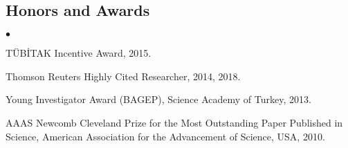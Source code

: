 \documentclass[margin,line]{res}
\newenvironment{list2}{
  \begin{list}{$\bullet$}{%
      \setlength{\itemsep}{0.1cm}
      \setlength{\parsep}{0in} \setlength{\parskip}{0in}
      \setlength{\topsep}{0in} \setlength{\partopsep}{0in} 
      \setlength{\leftmargin}{0.2in}}}{\end{list}}
\newenvironment{list4}{
  \begin{list}{$\bullet$}{%
      \setlength{\itemsep}{0cm}
      \setlength{\parsep}{0in} \setlength{\parskip}{0in}
      \setlength{\topsep}{0in} \setlength{\partopsep}{0in} 
      \setlength{\leftmargin}{0.2in}}}{\end{list}}
\newcommand{\junk}[1]{}
\begin{document}
\begin{resume}
          \junk{
            \section{\sc Academic Experience}
                    {\bf Case Western Reserve University}, Cleveland, Ohio, USA\\
                    
                    \vspace{-.2cm}
                           {\em Graduate Student \& Research Assistant} \hfill {\bf August, 2000
                             - August 2005}\\
                           Included  Ph.D.~research, Ph.D. level course work and
                           research projects, reviewing papers for bioinformatics, algorithms, and
                           database conferences and journals.
                           
                           {\em Teaching Assistant} \hfill {\bf August, 2000  - May 2001}\\
                           Duties included grading homework and office hours. 
                           \begin{list2}
                           \item Systems Programming, Fall 2000
                           \item Introduction to Bioinformatics, Fall 2001
                           \item Analysis of Algorithms, Spring 2001
                           \end{list2}
          }
          
          \clearpage
          
          \vspace*{-.2cm}
          \section{\sc Honors and Awards} 
          \begin{list4}
          \item
            TÜBİTAK Incentive Award, 2015.
          \item
            Thomson Reuters Highly Cited Researcher, 2014, 2018.
          \item
            Young Investigator Award (BAGEP), Science Academy of Turkey, 2013.
          \item
            AAAS Newcomb Cleveland Prize for the Most Outstanding Paper Published in Science, American Association for the Advancement of Science, USA, 2010.
          \end{list4}
          


\end{resume}
\end{document}
